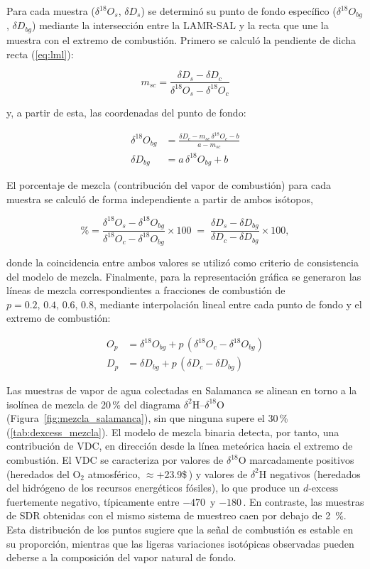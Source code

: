 Para cada muestra ($\delta^{18}O_s$, $\delta D_s$) se determinó su punto de
fondo específico ($\delta^{18}O_{bg}$, $\delta D_{bg}$) mediante la intersección 
entre la LAMR-SAL y la recta que une la muestra con el extremo de combustión. 
Primero se calculó la pendiente de dicha recta (\ref{eq:lml}):

\begin{equation}
m_{sc} = \frac{\delta D_s - \delta D_c}{\delta^{18}O_s - \delta^{18}O_c}
\end{equation}

y, a partir de esta, las coordenadas del punto de fondo:

\begin{align}
\delta^{18}O_{bg} &= \frac{\delta D_c - m_{sc}\,\delta^{18}O_c - b}{a - m_{sc}} \\
\delta D_{bg} &= a\,\delta^{18}O_{bg} + b
\end{align}

El porcentaje de mezcla (contribución del vapor de combustión) para 
cada muestra se calculó de forma independiente a partir de ambos isótopos,

\begin{equation}
\% = \frac{\delta^{18}O_s - \delta^{18}O_{bg}}{\delta^{18}O_c - \delta^{18}O_{bg}} \times 100 \;=\; \frac{\delta D_s - \delta D_{bg}}{\delta D_c - \delta D_{bg}} \times 100,
\end{equation}

donde la coincidencia entre ambos valores se utilizó como criterio de 
consistencia del modelo de mezcla. Finalmente, para la representación 
gráfica se generaron las líneas de mezcla correspondientes a fracciones
de combustión de $p = 0.2,\,0.4,\,0.6,\,0.8$, mediante interpolación lineal 
entre cada punto de fondo y el extremo de combustión:

\begin{align}
O_p &= \delta^{18}O_{bg} + p\,(\delta^{18}O_c - \delta^{18}O_{bg}) \\
D_p &= \delta D_{bg} + p\,(\delta D_c - \delta D_{bg})
\end{align}

Las muestras de vapor de agua colectadas en Salamanca se alinean en torno a la isolínea de mezcla 
de 20\,\% del diagrama $\delta^{2}$H--$\delta^{18}$O (Figura~\ref{fig:mezcla_salamanca}),
sin que ninguna supere el 30\,\% (\ref{tab:dexcess_mezcla}). El modelo de mezcla binaria detecta, por tanto, una contribución de VDC,
en dirección desde la línea meteórica hacia 
el extremo de combustión. El VDC se caracteriza por valores de $\delta^{18}\text{O}$ marcadamente 
positivos (heredados del $\text{O}_2$ atmosférico, $\approx $+23.9\$\,\textperthousand) y 
valores de $\delta^2\text{H}$ negativos (heredados del hidrógeno de los recursos
energéticos fósiles), 
lo que produce un $d\text{-excess}$ fuertemente negativo, típicamente entre $-470$\,\textperthousand 
y $-180$\,\textperthousand. %
En contraste, las muestras de SDR obtenidas con 
el mismo sistema de muestreo caen por debajo de 2~\%.
Esta distribución de los puntos sugiere que la señal de combustión es estable 
en su proporción, mientras que las ligeras variaciones isotópicas observadas pueden deberse a la 
composición del vapor natural de fondo. 

